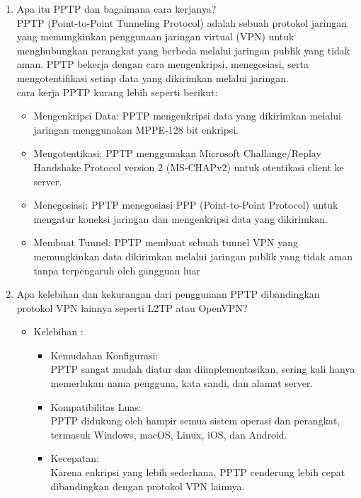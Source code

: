 \begin{enumerate}
	\item Apa itu PPTP dan bagaimana cara kerjanya?
	\\ \indent PPTP (Point-to-Point Tunneling Protocol) adalah sebuah protokol jaringan yang memungkinkan penggunaan jaringan virtual (VPN) untuk menghubungkan perangkat yang berbeda melalui jaringan publik yang tidak aman. 
	PPTP bekerja dengan cara mengenkripsi, menegosiasi, serta mengotentifikasi setiap data yang dikirimkan melalui jaringan. 
	\\ cara kerja PPTP kurang lebih seperti berikut:
	\begin{itemize}
		\item Mengenkripsi Data: PPTP mengenkripsi data yang dikirimkan melalui jaringan menggunakan MPPE-128 bit enkripsi.
		\item Mengotentikasi: PPTP menggunakan Microsoft Challange/Replay Handshake Protocol version 2 (MS-CHAPv2) untuk otentikasi client ke server.
		\item Menegosiasi: PPTP menegosiasi PPP (Point-to-Point Protocol) untuk mengatur koneksi jaringan dan mengenkripsi data yang dikirimkan.
		\item Membuat Tunnel: PPTP membuat sebuah tunnel VPN yang memungkinkan data dikirimkan melalui jaringan publik yang tidak aman tanpa terpengaruh oleh gangguan luar
	\end{itemize}

	\item Apa kelebihan dan kekurangan dari penggunaan PPTP dibandingkan protokol VPN lainnya seperti L2TP atau OpenVPN?
	
	\begin{itemize}
		\item Kelebihan :
		\begin{itemize}
			\item[\ding{58}] Kemudahan Konfigurasi: \\ PPTP sangat mudah diatur dan diimplementasikan, sering kali hanya memerlukan nama pengguna, kata sandi, dan alamat server.
			\item[\ding{58}] Kompatibilitas Luas: \\ PPTP didukung oleh hampir semua sistem operasi dan perangkat, termasuk Windows, macOS, Linux, iOS, dan Android.
			\item[\ding{58}] Kecepatan: \\ Karena enkripsi yang lebih sederhana, PPTP cenderung lebih cepat dibandingkan dengan protokol VPN lainnya.
		\end{itemize}


\end{itemize}
\end{enumerate}
